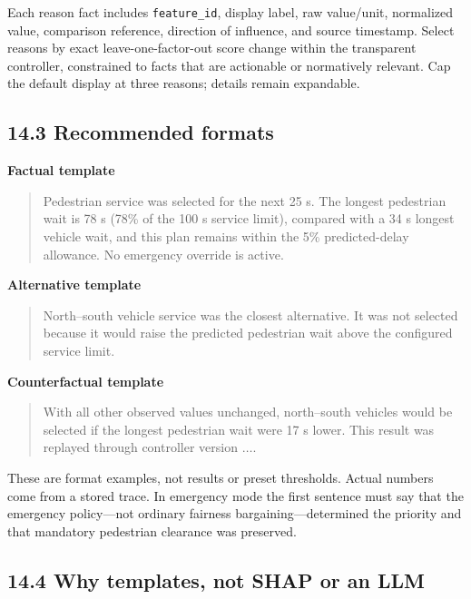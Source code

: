 \documentclass[
  english,
  11pt,
  a4paper,
]{article}
\begin{document}
Each reason fact includes \texttt{feature\_id}, display label, raw
value/unit, normalized value, comparison reference, direction of
influence, and source timestamp. Select reasons by exact
leave-one-factor-out score change within the transparent controller,
constrained to facts that are actionable or normatively relevant. Cap
the default display at three reasons; details remain expandable.

\subsection{14.3 Recommended formats}\label{recommended-formats}

\textbf{Factual template}

\begin{quote}
Pedestrian service was selected for the next 25 s. The longest
pedestrian wait is 78 s (78\% of the 100 s service limit), compared with
a 34 s longest vehicle wait, and this plan remains within the 5\%
predicted-delay allowance. No emergency override is active.
\end{quote}

\textbf{Alternative template}

\begin{quote}
North--south vehicle service was the closest alternative. It was not
selected because it would raise the predicted pedestrian wait above the
configured service limit.
\end{quote}

\textbf{Counterfactual template}

\begin{quote}
With all other observed values unchanged, north--south vehicles would be
selected if the longest pedestrian wait were 17 s lower. This result was
replayed through controller version \(\ldots{}\).
\end{quote}

These are format examples, not results or preset thresholds. Actual
numbers come from a stored trace. In emergency mode the first sentence
must say that the emergency policy---not ordinary fairness
bargaining---determined the priority and that mandatory pedestrian
clearance was preserved.

\subsection{14.4 Why templates, not SHAP or an
LLM}\label{why-templates-not-shap-or-an-llm}
\end{document}
